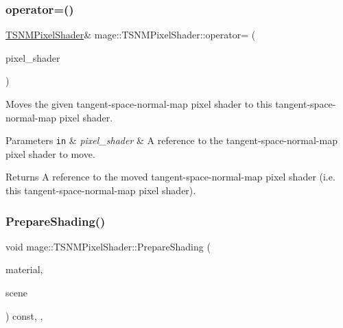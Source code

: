 \subsubsection{\texorpdfstring{operator=()}{operator=()}\hspace{0.1cm}{\footnotesize\ttfamily [2/2]}}
{\footnotesize\ttfamily \hyperlink{classmage_1_1_t_s_n_m_pixel_shader}{T\+S\+N\+M\+Pixel\+Shader}\& mage\+::\+T\+S\+N\+M\+Pixel\+Shader\+::operator= (\begin{DoxyParamCaption}\item[{\hyperlink{classmage_1_1_t_s_n_m_pixel_shader}{T\+S\+N\+M\+Pixel\+Shader} \&\&}]{pixel\+\_\+shader }\end{DoxyParamCaption})\hspace{0.3cm}{\ttfamily [delete]}}

Moves the given tangent-\/space-\/normal-\/map pixel shader to this tangent-\/space-\/normal-\/map pixel shader.


\begin{DoxyParams}[1]{Parameters}
\mbox{\tt in}  & {\em pixel\+\_\+shader} & A reference to the tangent-\/space-\/normal-\/map pixel shader to move. \\
\hline
\end{DoxyParams}
\begin{DoxyReturn}{Returns}
A reference to the moved tangent-\/space-\/normal-\/map pixel shader (i.\+e. this tangent-\/space-\/normal-\/map pixel shader). 
\end{DoxyReturn}
\hypertarget{classmage_1_1_t_s_n_m_pixel_shader_a9b9f44b0cf757061e1c29388c9b20c38}{}\label{classmage_1_1_t_s_n_m_pixel_shader_a9b9f44b0cf757061e1c29388c9b20c38} 
\subsubsection{\texorpdfstring{Prepare\+Shading()}{PrepareShading()}}
{\footnotesize\ttfamily void mage\+::\+T\+S\+N\+M\+Pixel\+Shader\+::\+Prepare\+Shading (\begin{DoxyParamCaption}\item[{const \hyperlink{structmage_1_1_material}{Material} \&}]{material,  }\item[{const \hyperlink{structmage_1_1_scene_info}{Scene\+Info} \&}]{scene }\end{DoxyParamCaption}) const\hspace{0.3cm}{\ttfamily [final]}, {\ttfamily [override]}, {\ttfamily [virtual]}}

